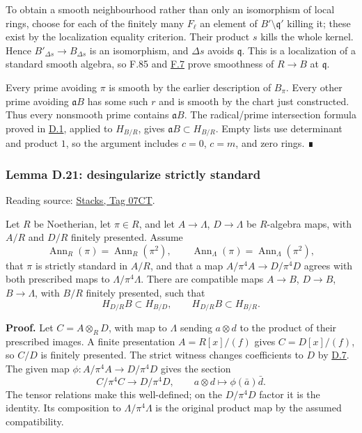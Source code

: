 \documentclass[11pt,a4paper,openany]{report}
\begin{document}
To obtain a smooth neighbourhood rather than only an isomorphism of local rings, choose for each of the finitely many \(F_\ell\) an element of \(B'\setminus\mathfrak q'\) killing it; these exist by the localization equality criterion. Their product \(s\) kills the whole kernel. Hence \(B'_{\Delta s}\to B_{\Delta s}\) is an isomorphism, and \(\Delta s\) avoids \(\mathfrak q\). This is a localization of a standard smooth algebra, so F.85 and \hyperref[AG-RG-S05-algebra-definition-smooth-at-prime]{F.7} prove smoothness of \(R\to B\) at \(\mathfrak q\).

Every prime avoiding \(\pi\) is smooth by the earlier description of \(B_\pi\). Every other prime avoiding \(\mathfrak aB\) has some such \(r\) and is smooth by the chart just constructed. Thus every nonsmooth prime contains \(\mathfrak aB\). The radical/prime intersection formula proved in \hyperref[AG-RG-S05-smoothing-definition-singular-ideal]{D.1}, applied to \(H_{B/R}\), gives \(\mathfrak aB\subset H_{B/R}\). Empty lists use determinant and product \(1\), so the argument includes \(c=0\), \(c=m\), and zero rings. ∎

\label{AG-RG-S05-smoothing-lemma-desingularize-strictly-standard}

\subsubsection{Lemma D.21: desingularize strictly standard}\label{AG-RG-S05-lemma-d.21-desingularize-strictly-standard}

Reading source: \href{https://stacks.math.columbia.edu/tag/07CT}{Stacks, Tag 07CT}.

Let \(R\) be Noetherian, let \(\pi\in R\), and let \(A\to\Lambda\), \(D\to\Lambda\) be \(R\)-algebra maps, with \(A/R\) and \(D/R\) finitely presented. Assume \[
\operatorname{Ann}_R(\pi)=\operatorname{Ann}_R(\pi^2),\qquad
\operatorname{Ann}_\Lambda(\pi)=\operatorname{Ann}_\Lambda(\pi^2),
\] that \(\pi\) is strictly standard in \(A/R\), and that a map \(A/\pi^4A\to D/\pi^4D\) agrees with both prescribed maps to \(\Lambda/\pi^4\Lambda\). There are compatible maps \(A\to B\), \(D\to B\), \(B\to\Lambda\), with \(B/R\) finitely presented, such that \[
H_{D/R}B\subset H_{B/D},
\qquad
H_{D/R}B\subset H_{B/R}.
\]

\textbf{Proof.} Let \(C=A\otimes_RD\), with map to \(\Lambda\) sending \(a\otimes d\) to the product of their prescribed images. A finite presentation \(A=R[x]/(f)\) gives \(C=D[x]/(f)\), so \(C/D\) is finitely presented. The strict witness changes coefficients to \(D\) by \hyperref[AG-RG-S05-smoothing-lemma-strictly-standard-base-change]{D.7}. The given map \(\phi:A/\pi^4A\to D/\pi^4D\) gives the section \[
C/\pi^4C\longrightarrow D/\pi^4D,\qquad
a\otimes d\longmapsto\phi(\bar a)\bar d.
\] The tensor relations make this well-defined; on the \(D/\pi^4D\) factor it is the identity. Its composition to \(\Lambda/\pi^4\Lambda\) is the original product map by the assumed compatibility.
\end{document}
